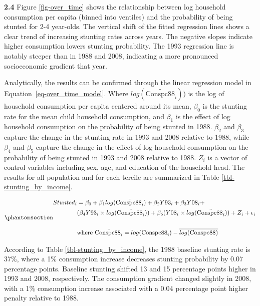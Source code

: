 \documentclass[
  letterpaper,
  DIV=11,
  numbers=noendperiod]{scrartcl}
\begin{document}
\textbf{2.4} Figure \ref{fig-over_time} shows the relationship between
log household consumption per capita (binned into ventiles) and the
probability of being stunted for 2-4 year-olds. The vertical shift of
the fitted regression lines shows a clear trend of increasing stunting
rates across years. The negative slopes indicate higher consumption
lowers stunting probability. The 1993 regression line is notably steeper
than in 1988 and 2008, indicating a more pronounced socioeconomic
gradient that year.

Analytically, the results can be confirmed through the linear regression
model in Equation~\ref{eq-over_time_model}. Where
\(log(\tilde{\text{Conspc88}_i}))\) is the log of household consumption
per capita centered around its mean, \(\beta_0\) is the stunting rate
for the mean child household consumption, and \(\beta_1\) is the effect
of log household consumption on the probability of being stunted in
1988. \(\beta_2\) and \(\beta_3\) capture the change in the stunting
rate in 1993 and 2008 relative to 1988, while \(\beta_4\) and
\(\beta_5\) capture the change in the effect of log household
consumption on the probability of being stunted in 1993 and 2008
relative to 1988. \(Z_i\) is a vector of control variables including
sex, age, and education of the household head. The results for all
population and for each tercile are summarized in Table
\ref{tbl-stunting_by_income}.

\begin{equation}\protect\phantomsection\label{eq-over_time_model}{
\begin{aligned}
Stunted_i & = \beta_0 + \beta_1 log(\tilde{\text{Conspc88}_i}) + \beta_2 Y93_i + \beta_3 Y08_i + \\
& (\beta_4 Y93_i \times log(\tilde{\text{Conspc88}_i})) + \beta_5 (Y08_i \times log(\tilde{\text{Conspc88}_i})) + Z_i + \epsilon_i\\\\
& \text{where } \tilde{\text{Conspc88}_i} = log(\text{Conspc88}_i) - \overline{log(\text{Conspc88})}
\end{aligned}
}\end{equation}

According to Table \ref{tbl-stunting_by_income}, the 1988 baseline
stunting rate is 37\%, where a 1\% consumption increase decreases
stunting probability by 0.07 percentage points. Baseline stunting
shifted 13 and 15 percentage points higher in 1993 and 2008,
respectively. The consumption gradient changed slightly in 2008, with a
1\% consumption increase associated with a 0.04 percentage point higher
penalty relative to 1988.
\end{document}
